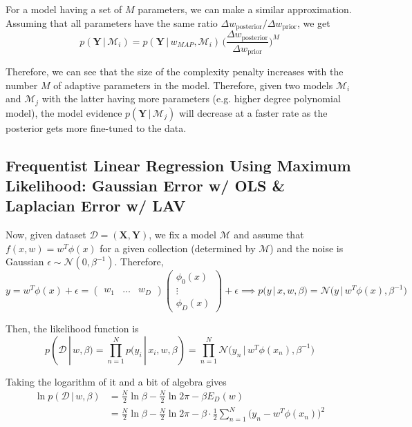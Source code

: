   For a model having a set of $M$ parameters, we can make a similar approximation. Assuming that all parameters have the same ratio $\Delta w_{\text{posterior}}/\Delta w_{\text{prior}}$, we get
  \begin{equation}
    p(\mathbf{Y}\,|\,\mathcal{M}_i) = p(\mathbf{Y}\,|\, w_{MAP}, \mathcal{M}_i) \, \bigg(\frac{\Delta w_{\text{posterior}}}{\Delta w_{\text{prior}}} \bigg)^M
  \end{equation}

  Therefore, we can see that the size of the complexity penalty increases with the number $M$ of adaptive parameters in the model. Therefore, given two models $\mathcal{M}_i$ and $\mathcal{M}_j$ with the latter having more parameters (e.g. higher degree polynomial model), the model evidence $p(\mathbf{Y}\,|\,\mathcal{M}_j)$ will decrease at a faster rate as the posterior gets more fine-tuned to the data.

\subsection{Frequentist Linear Regression Using Maximum Likelihood: Gaussian Error w/ OLS \& Laplacian Error w/ LAV}

  Now, given dataset $\mathcal{D} = (\mathbf{X}, \mathbf{Y})$, we fix a model $\mathcal{M}$ and assume that $f(x, w) = w^T \phi(x)$ for a given collection (determined by $\mathcal{M}$) and the noise is Gaussian $\epsilon \sim \mathcal{N}(0, \beta^{-1})$. Therefore,
  \begin{equation}
    y = w^T \phi(x) + \epsilon = \begin{pmatrix} w_1 & \ldots & w_D \end{pmatrix} \begin{pmatrix} \phi_0 (x) \\ \vdots \\ \phi_D (x) \end{pmatrix} + \epsilon \implies p(y\,|\,x, w, \beta) = \mathcal{N} \big(y\,|\, w^T \phi(x), \beta^{-1} \big)
  \end{equation}

  Then, the likelihood function is
  \begin{equation}
    p(\mathcal{D}\,|\,w, \beta) = \prod_{n=1}^N p(y_i\,|\,x_i, w, \beta) = \prod_{n=1}^N \mathcal{N}\big( y_n \,|\, w^T \phi(x_n), \beta^{-1} \big)
  \end{equation}

  Taking the logarithm of it and a bit of algebra gives
  \begin{align*}
    \ln p(\mathcal{D}\,|\,w, \beta) & = \frac{N}{2} \ln{\beta} - \frac{N}{2} \ln{2\pi} - \beta E_D (w)\\
    & = \frac{N}{2} \ln{\beta} - \frac{N}{2} \ln{2\pi} - \beta \cdot \frac{1}{2} \sum_{n=1}^N \big(y_n - w^T \phi(x_n)\big)^2
  \end{align*}


